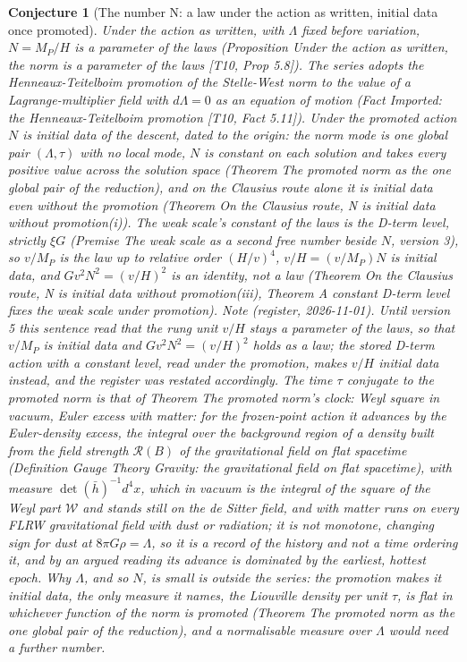 \documentclass[11pt]{article}
\newtheorem{conjecture}[theorem]{Conjecture}
\theoremstyle{definition}
\theoremstyle{plain}
\newcommand{\changedmark}[2]{\marginpar{\raggedright\scriptsize\color{#1}#2}}
\providecommand{\hb}{}\renewcommand{\hb}{\bar{h}}
\begin{document}
\begin{conjecture}[The number N: a law under the action as written, initial data once promoted]\label{c:programme.n-parameter-of-the-laws}
\changedmark{BurntOrange}{changed since the deposit}
Under the action as written, with $\Lambda$ fixed before variation, $N = M_{P}/H$ is a parameter of the laws (Proposition \emph{Under the action as written, the norm is a parameter of the laws} [T10, Prop 5.8]). The series adopts the Henneaux-Teitelboim promotion of the Stelle-West norm to the value of a Lagrange-multiplier field with $d\Lambda = 0$ as an equation of motion (Fact \emph{Imported: the Henneaux-Teitelboim promotion} [T10, Fact 5.11]). Under the promoted action $N$ is initial data of the descent, dated to the origin: the norm mode is one global pair $(\Lambda, \tau)$ with no local mode, $N$ is constant on each solution and takes every positive value across the solution space (Theorem \emph{The promoted norm as the one global pair of the reduction}), and on the Clausius route alone it is initial data even without the promotion (Theorem \emph{On the Clausius route, N is initial data without promotion}(i)). The weak scale's constant of the laws is the D-term level, strictly $\xi G$ (Premise \emph{The weak scale as a second free number beside $N$}, version 3), so $v/M_{P}$ is the law up to relative order $(H/v)^{4}$, $v/H = (v/M_{P})N$ is initial data, and $Gv^{2}N^{2} = (v/H)^{2}$ is an identity, not a law (Theorem \emph{On the Clausius route, N is initial data without promotion}(iii), Theorem \emph{A constant D-term level fixes the weak scale under promotion}). \emph{Note (register, 2026-11-01).} Until version 5 this sentence read that the rung unit $v/H$ stays a parameter of the laws, so that $v/M_{P}$ is initial data and $Gv^{2}N^{2} = (v/H)^{2}$ holds as a law; the stored D-term action with a constant level, read under the promotion, makes $v/H$ initial data instead, and the register was restated accordingly. The time $\tau$ conjugate to the promoted norm is that of Theorem \emph{The promoted norm's clock: Weyl square in vacuum, Euler excess with matter}: for the frozen-point action it advances by the Euler-density excess, the integral over the background region of a density built from the field strength $\mathcal{R}(B)$ of the gravitational field on flat spacetime (Definition \emph{Gauge Theory Gravity: the gravitational field on flat spacetime}), with measure $\det(\hb)^{-1}d^{4}x$, which in vacuum is the integral of the square of the Weyl part $\mathcal{W}$ and stands still on the de Sitter field, and with matter runs on every FLRW gravitational field with dust or radiation; it is not monotone, changing sign for dust at $8\pi G\rho = \Lambda$, so it is a record of the history and not a time ordering it, and by an argued reading its advance is dominated by the earliest, hottest epoch. Why $\Lambda$, and so $N$, is small is outside the series: the promotion makes it initial data, the only measure it names, the Liouville density per unit $\tau$, is flat in whichever function of the norm is promoted (Theorem \emph{The promoted norm as the one global pair of the reduction}), and a normalisable measure over $\Lambda$ would need a further number.


\end{conjecture}
\end{document}

